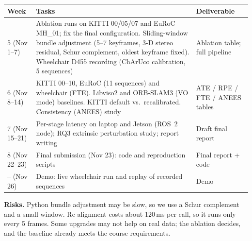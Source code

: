 \documentclass[11pt,a4paper]{article}
\begin{document}
\begin{table}[H]
\centering\footnotesize
\vspace{-0.2cm}
\begin{tabular}{p{2.1cm}p{10.5cm}p{3.0cm}}
\toprule
Week & Tasks & Deliverable \\
\midrule
5 (Nov 1--7) & Ablation runs on KITTI 00/05/07 and EuRoC MH\_01; fix the final configuration. Sliding-window bundle adjustment (5--7 keyframes, 3-D stereo residual, Schur complement, oldest keyframe fixed). Wheelchair D455 recording (ChArUco calibration, 5 sequences) & Ablation table; full pipeline \\
6 (Nov 8--14) & KITTI 00--10, EuRoC (11 sequences) and wheelchair (FTE). Libviso2 and ORB-SLAM3 (VO mode) baselines. KITTI default vs.\ recalibrated. Consistency (ANEES) study & ATE / RPE / FTE / ANEES tables \\
7 (Nov 15--21) & Per-stage latency on laptop and Jetson (ROS~2 node); RQ3 extrinsic perturbation study; report writing & Draft final report \\
8 (Nov 22--23) & Final submission (Nov 23): code and reproduction scripts & Final report + code \\
-- (Nov 26) & Demo: live wheelchair run and replay of recorded sequences & Demo \\
\bottomrule
\end{tabular}
\vspace{-0.2cm}
\end{table}
\noindent\textbf{Risks.} Python bundle adjustment may be slow, so we use a Schur complement and a small window. Re-alignment costs about 120\,ms per call, so it runs only every 5 frames. Some upgrades may not help on real data; the ablation decides, and the baseline already meets the course requirements.
\end{document}
